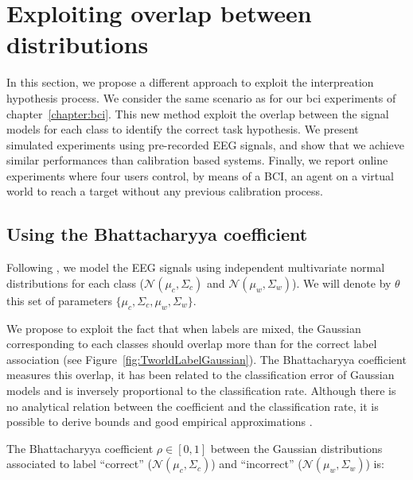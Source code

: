
\section{Exploiting overlap between distributions}
\label{chapter:limitations:overlap}

In this section, we propose a different approach to exploit the interpreation hypothesis process. We consider the same scenario as for our bci experiments of chapter~\ref{chapter:bci}. This new method exploit the overlap between the signal models for each class to identify the correct task hypothesis. We present simulated experiments using pre-recorded EEG signals, and show that we achieve similar performances than calibration based systems. Finally, we report online experiments where four users control, by means of a BCI, an agent on a virtual world to reach a target without any previous calibration process.


\subsection{Using the Bhattacharyya coefficient}

Following \cite{lotte2007review,blankertz2010single}, we model the EEG signals using independent multivariate normal distributions for each class ($\mathcal{N}(\mu_c, \Sigma_c)$ and $\mathcal{N}(\mu_w, \Sigma_w)$). We will denote by $\theta$ this set of parameters $\{\mu_c, \Sigma_c,\mu_w, \Sigma_w\}$.

We propose to exploit the fact that when labels are mixed, the Gaussian corresponding to each classes should overlap more than for the correct label association (see Figure~\ref{fig:TworldLabelGaussian}). The Bhattacharyya coefficient measures this overlap, it has been related to the classification error of Gaussian models \cite{Kailath67} and is inversely proportional to the classification rate. Although there is no analytical relation between the coefficient and the classification rate, it is possible to derive bounds and good empirical approximations \cite{lee2000bayes}.

The Bhattacharyya coefficient $\rho \in [0,1]$ between the Gaussian distributions associated to label ``correct'' ($\mathcal{N}(\mu_c, \Sigma_c)$) and ``incorrect'' ($\mathcal{N}(\mu_w, \Sigma_w)$) is:

